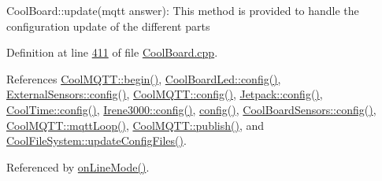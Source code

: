 Cool\+Board\+::update(mqtt answer)\+: This method is provided to handle the configuration update of the different parts 

Definition at line \hyperlink{_cool_board_8cpp_source_l00411}{411} of file \hyperlink{_cool_board_8cpp_source}{Cool\+Board.\+cpp}.



References \hyperlink{_cool_m_q_t_t_8cpp_source_l00026}{Cool\+M\+Q\+T\+T\+::begin()}, \hyperlink{_cool_board_led_8cpp_source_l00141}{Cool\+Board\+Led\+::config()}, \hyperlink{_external_sensors_8cpp_source_l00118}{External\+Sensors\+::config()}, \hyperlink{_cool_m_q_t_t_8cpp_source_l00340}{Cool\+M\+Q\+T\+T\+::config()}, \hyperlink{_jetpack_8cpp_source_l00183}{Jetpack\+::config()}, \hyperlink{_cool_time_8cpp_source_l00237}{Cool\+Time\+::config()}, \hyperlink{irene3000_8cpp_source_l00074}{Irene3000\+::config()}, \hyperlink{_cool_board_8cpp_source_l00232}{config()}, \hyperlink{_cool_board_sensors_8cpp_source_l00222}{Cool\+Board\+Sensors\+::config()}, \hyperlink{_cool_m_q_t_t_8cpp_source_l00147}{Cool\+M\+Q\+T\+T\+::mqtt\+Loop()}, \hyperlink{_cool_m_q_t_t_8cpp_source_l00102}{Cool\+M\+Q\+T\+T\+::publish()}, and \hyperlink{_cool_file_system_8cpp_source_l00065}{Cool\+File\+System\+::update\+Config\+Files()}.



Referenced by \hyperlink{_cool_board_8cpp_source_l00097}{on\+Line\+Mode()}.


